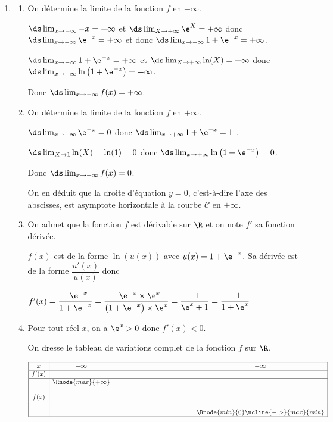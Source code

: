 \begin{enumerate}
\item 
	\begin{enumerate}
		\item On détermine la limite de la fonction $f$ en $-\infty$.
		
$\ds\lim_{x\to -\infty} -x = +\infty$ et $\ds\lim_{X\to +\infty} \e^{X}=+\infty$ donc $\ds\lim_{x\to -\infty} \e^{-x}=+\infty$ et donc $\ds\lim_{x\to -\infty} 1+\e^{-x}=+\infty$.

$\ds\lim_{x\to -\infty} 1+\e^{-x}=+\infty$ et $\ds\lim_{X\to +\infty} \ln(X)=+\infty$ donc $\ds\lim_{x\to -\infty} \ln\left (1+\e^{-x}\right )=+\infty$.

Donc $\ds\lim_{x\to -\infty} f(x)=+\infty$.
		
		\item On détermine la limite de la fonction $f$ en $+\infty$.
		
$\ds\lim_{x\to +\infty} \e^{-x} = 0$ donc $\ds\lim_{x\to +\infty} 1+\e^{-x} = 1$ .

$\ds\lim_{X\to 1} \ln(X)= \ln(1) = 0$ donc $\ds\lim_{x\to +\infty} \ln\left (1+\e^{-x}\right ) = 0$.

Donc $\ds\lim_{x\to +\infty} f(x)=0$.



On en déduit que la droite d'équation $y=0$, c'est-à-dire l'axe des abscisses, est asymptote horizontale à la courbe $\mathcal{C}$ en $+\infty$.

		\item On admet que la fonction $f$ est dérivable sur $\R$ et on note $f'$ sa fonction dérivée.

$f(x)$ est de la forme $\ln(u(x))$ avec $u(x)=1+\e^{-x}$.
Sa dérivée est de la forme $\dfrac{u'(x)}{u(x)}$ donc

$f'(x)= \dfrac{-\e^{-x}}{1+\e^{-x}} =  \dfrac{-\e^{-x}\times \e^{x}}{\left (1+\e^{-x}\right )\times \e^{x}} = \dfrac{-1}{\e^{x}+1}=\dfrac{-1}{1+\e^{x}}$
		

		\item Pour tout réel $x$, on a $\e^{x}>0$ donc $f'(x)<0$.
		
On dresse le tableau de variations complet de la fonction $f$ sur $\R$.

\begin{center}
{\renewcommand{\arraystretch}{1.3}
\def\esp{\hspace*{4cm}}
\def\hauteur{20pt}
$\begin{array}{|c| *3{c}|}
\hline
 x & -\infty   & \esp & +\infty \\
 \hline
f'(x) &   & \pmb{-} & \\  
\hline
  &  \Rnode{max}{+\infty} &    &    \\
f(x) & &  &  \rule{0pt}{\hauteur} \\
 &      & & \Rnode{min}{0} \rule{0pt}{\hauteur}
\ncline{->}{max}{min}
\\
\hline
\end{array}$
}
\end{center}


\end{enumerate}
\end{enumerate}
